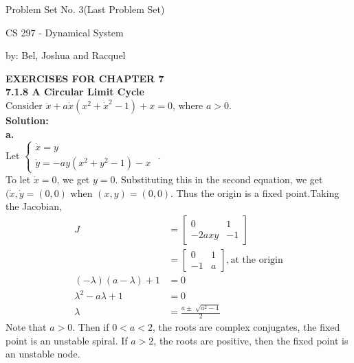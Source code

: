 \documentclass[12pt]{article}
\newtheorem{theorem}{THEOREM}
\begin{document}
	
	\centerline{{\sc Problem Set No. 3(Last Problem Set)}}
	\bigskip
	\centerline{CS 297 - Dynamical System}
	\centerline{by: Bel, Joshua and Racquel}
	
	\bigskip\noindent
	{\bf EXERCISES FOR CHAPTER 7 }\\
	{\bf 7.1.8 A Circular Limit Cycle} \\
	Consider $\ddot{x} + a\dot{x}(x^2+\dot{x}^2-1)+x = 0$, where $a > 0$.
	\\{\bf Solution: }\\
	\indent
	{\bf a. }\\ 
	
	Let $\begin{cases} \dot{x}=y \\ \dot{y}=-ay(x^2 + y^2 -1) -x \end{cases}$ . \\
	
	To let $\dot{x}=0$, we get $y = 0$. Substituting this in the second equation, we get $(\dot{x},\dot{y} = (0,0)$ when $(x,y) = (0,0)$. Thus the origin is a fixed point.Taking the Jacobian, \\
	\begin{align*}
	J&=\begin{bmatrix}
	0 & 1\\
	-2axy & -1
	\end{bmatrix}\\
	&= \begin{bmatrix}
	0 & 1\\
	-1 & a
	\end{bmatrix},\text{at the origin}\\
	(-\lambda)(a-\lambda) + 1 &= 0\\
	\lambda^2 -a\lambda + 1 &=0\\
	\lambda &= \frac{a \pm \sqrt[]{a^2-4}}{2}
	\end{align*}
	Note that $a > 0$. Then if $0 < a < 2$, the roots are complex conjugates, the fixed point is an unstable spiral. If $a > 2$, the roots are positive, then the fixed point is an unstable node.\\
	
\end{document}
